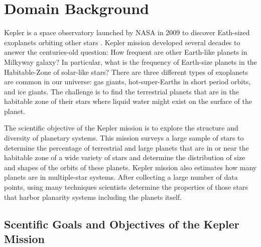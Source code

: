 
\chapter{Domain Background}




Kepler is a space observatory launched by NASA in 2009 to discover Eath-sized exoplanets orbiting other stars  \cite{2010ApJ...713L..87J}. Kepler mission developed several decades to answer the centuries-old question: How frequent are other Earth-like planets in Milkyway galaxy? In particular, what is the frequency of Earth-size planets in the Habitable-Zone of solar-like stars? There are three different types of exoplanets are common in our universe: gas giants, hot-super-Earths in short period orbits, and ice giants. The challenge is to find the terrestrial planets that are in the habitable zone of their stars where liquid water might exist on the surface of the planet.

The scientific objective of the Kepler mission is to explore the structure and diversity of planetary systems. This mission surveys a large sample of stars to determine the percentage of terrestrial and large planets that are in or near the habitable zone of a wide variety of stars and determine the distribution of size and shapes of the orbits of these planets. Kepler mission also estimates how many planets are in multiple-star systems. After collecting a large number of data points, using many techniques scientists determine the properties of those stars that harbor planarity systems including the planets itself. 

\section{Scentific Goals and Objectives of the Kepler Mission}


